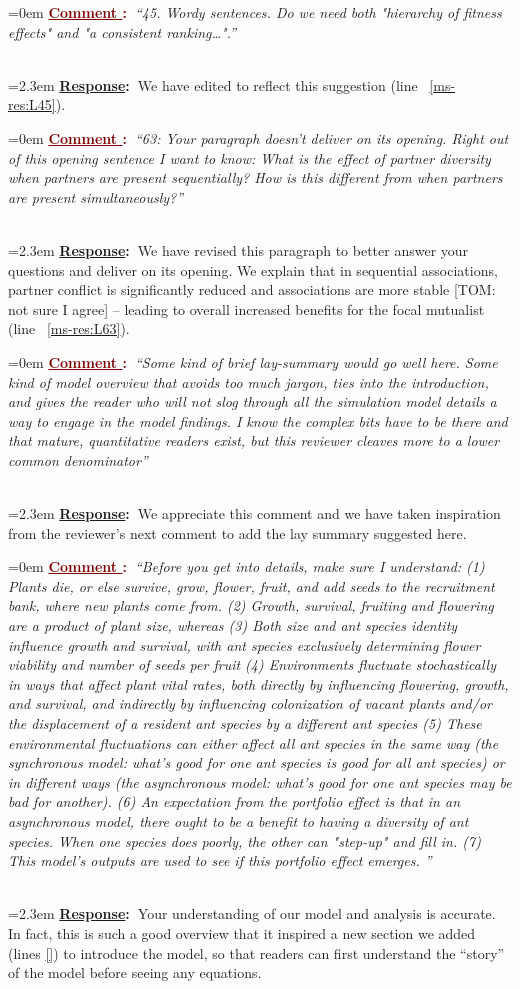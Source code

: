 \documentclass[12pt]{article}
\newcounter{cN}
\newcommand{\comment}[1]{
	\vspace{2em}
	\refstepcounter{cN} %
	\noindent \hangindent=0em \textbf{\textcolor{Maroon}{\uline{Comment \thecN}:~}}\emph{``#1''}
	}
\newcommand{\response}[1]{
	\\[0.25em]
	\hangindent=2.3em \textbf{\textcolor{NavyBlue}{\uline{Response}:~}}#1
	}
\begin{document}
\comment{45. Wordy sentences. Do we need both "hierarchy of fitness effects" and "a consistent ranking…".}
\response{We have edited to reflect this suggestion (line ~\ref{ms-res:L45}).}

\comment{63: Your paragraph doesn't deliver on its opening. 
Right out of this opening sentence I want to know: What is the effect of partner diversity when partners are present sequentially? 
How is this different from when partners are present simultaneously?}
\response{We have revised this paragraph to better answer your questions and deliver on its opening. 
We explain that in sequential associations, partner conflict is significantly reduced and associations are more stable [TOM: not sure I agree] -- leading to overall increased benefits for the focal mutualist (line ~\ref{ms-res:L63}).}

\comment{Some kind of brief lay-summary would go well here. 
Some kind of model overview that avoids too much jargon, ties into the introduction, and gives the reader who will not slog through all the simulation model details a way to engage in the model findings. 
I know the complex bits have to be there and that mature, quantitative readers exist, but this reviewer cleaves more to a lower common denominator}
\response{We appreciate this comment and we have taken inspiration from the reviewer's next comment to add the lay summary suggested here.}

\comment{Before you get into details, make sure I understand:
(1)     Plants die, or else survive, grow, flower, fruit, and add seeds to the recruitment bank, where new plants come from.
(2)     Growth, survival, fruiting and flowering are a product of plant size, whereas
(3)     Both size and ant species identity influence growth and survival, with ant species exclusively determining flower viability and number of seeds per fruit
(4)     Environments fluctuate stochastically in ways that affect plant vital rates, both directly by influencing flowering, growth, and survival, and indirectly by influencing colonization of vacant plants and/or the displacement of a resident ant species by a different ant species
(5)     These environmental fluctuations can either affect all ant species in the same way (the synchronous model:  what's good for one ant species is good for all ant species) or in different ways (the asynchronous model: what's good for one ant species may be bad for another).
(6)     An expectation from the portfolio effect is that in an asynchronous model, there ought to be a benefit to having a diversity of ant species. When one species does poorly, the other can "step-up" and fill in.
(7)     This model's outputs are used to see if this portfolio effect emerges. }
\response{Your understanding of our model and analysis is accurate. 
	In fact, this is such a good overview that it inspired a new section we added (lines \ref{}) to introduce the model, so that readers can first understand the ``story'' of the model before seeing any equations.}


\end{document}
